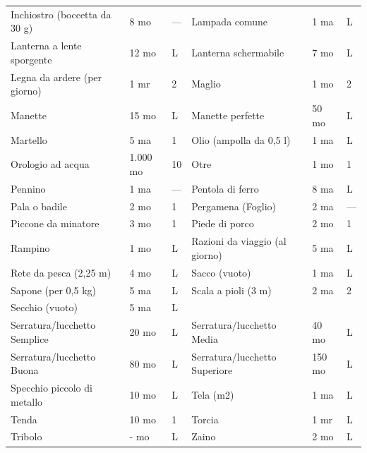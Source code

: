\documentclass[a4paper,11pt,twoside,openany]{book}
\begin{document}
\begin{tabularx}{\textwidth}{XllXll}
	Inchiostro (boccetta da 30 g)& 8 mo& —   & Lampada comune& 1 ma& L   \\
	Lanterna a lente sporgente  & 12 mo    & L   & Lanterna schermabile& 7 mo& L   \\
	Legna da ardere (per giorno)& 1 mr& 2   & Maglio& 1 mo& 2   \\
	Manette & 15 mo    & L   & Manette perfette    & 50 mo& L   \\
	Martello& 5 ma& 1   & Olio (ampolla da 0,5 l)& 1 ma& L   \\
	Orologio ad acqua   & 1.000 mo & 10  & Otre  & 1 mo& 1   \\
	Pennino & 1 ma& —   & Pentola di ferro    & 8 ma& L   \\
	Pala o badile & 2 mo& 1   & Pergamena (Foglio)  & 2 ma& —   \\
	Piccone da minatore & 3 mo& 1   & Piede di porco& 2 mo& 1   \\
	Rampino & 1 mo& L   & Razioni da viaggio (al giorno)    & 5 ma& L   \\
	Rete da pesca (2,25 m)& 4 mo& L   & Sacco (vuoto) & 1 ma& L   \\
	Sapone (per 0,5 kg) & 5 ma& L   & Scala a pioli (3 m) & 2 ma& 2   \\
	Secchio (vuoto)& 5 ma& L   & \\
	Serratura/lucchetto Semplice& 20 mo    & L   & Serratura/lucchetto Media & 40 mo& L   \\
	Serratura/lucchetto Buona & 80 mo    & L   & Serratura/lucchetto Superiore& 150 mo    & L   \\
	Specchio piccolo di metallo & 10 mo    & L   & Tela (m2)& 1 ma& L   \\
	Tenda & 10 mo    & 1   & Torcia& 1 mr& L   \\
	Tribolo & - mo& L   & Zaino & 2 mo& L   \\
\end{tabularx}
\bigskip
\end{document}
